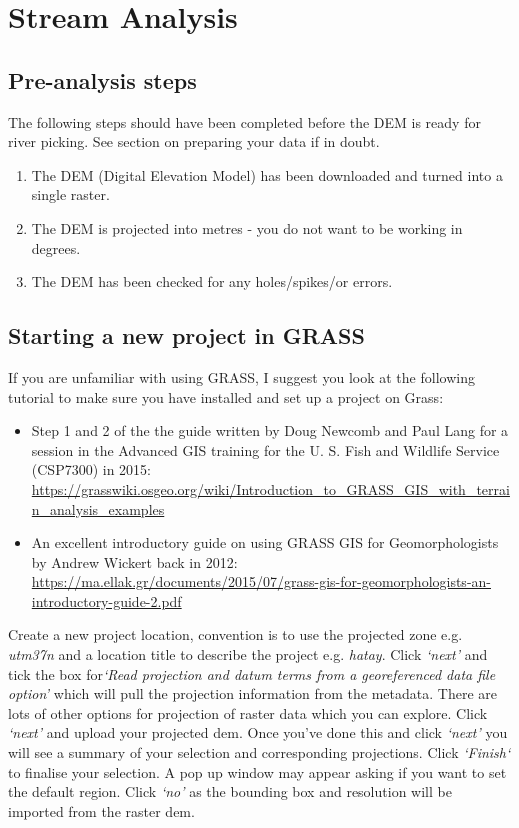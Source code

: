 \chapter{Stream Analysis} \label{stream}

\section{Pre-analysis steps}

The following steps should have been completed before the DEM is ready for river picking. See  section on preparing your data if in doubt. 

\begin{enumerate}
\item The DEM (Digital Elevation Model) has been downloaded and turned into a single raster. 
\item The DEM is projected into metres - you do not want to be working in degrees. 
\item The DEM has been checked for any holes/spikes/or errors. 
\end{enumerate}


\section{Starting a new project in GRASS}

If you are unfamiliar with using GRASS, I suggest you look at the following tutorial to make sure you have installed and set up a project on Grass:

\begin{itemize}
\item Step 1 and 2 of the the guide written by Doug Newcomb and Paul Lang for a session in the Advanced GIS training for the U. S. Fish and Wildlife Service (CSP7300) in 2015:
\url{https://grasswiki.osgeo.org/wiki/Introduction_to_GRASS_GIS_with_terrain_analysis_examples}
\item
An excellent introductory guide on using GRASS GIS for Geomorphologists by Andrew Wickert back in 2012:
\url{https://ma.ellak.gr/documents/2015/07/grass-gis-for-geomorphologists-an-introductory-guide-2.pdf}
\end{itemize}


Create a new project location, convention is to use the projected zone e.g. \textit{utm37n} and a location title to describe the project e.g. \textit{hatay}. Click \textit{`next'} and tick the box for\textit{`Read projection and datum terms from a georeferenced data file option’} which will pull the projection information from the metadata. There are lots of other options for projection of raster data which you can explore. Click \textit{`next'} and upload your projected dem. Once you’ve done this and click \textit{`next'} you will see a summary of your selection and corresponding projections. Click \textit{`Finish`} to finalise your selection. A pop up window may appear asking if you want to set the default region. Click \textit{`no'} as the bounding box and resolution will be imported from the raster dem. 

